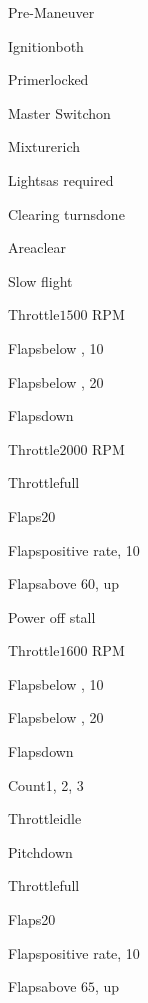 




\begin{multicols}{2}
  \begin{checklist}{Pre-Maneuver}
    \item{Ignition}{both}
    \item{Primer}{locked}
    \item{Master Switch}{on}
    \item{Mixture}{rich}
    \item{Lights}{as required}
    \item{Clearing turns}{done}
    \item{Area}{clear}
\end{checklist}

\begin{checklist}{Slow flight}
  \item{Throttle}{$1500$ RPM}
  \item{Flaps}{below \vfe, 10\degree}
  \item{Flaps}{below \vfe, 20\degree}
  \item{Flaps}{down}
  \item{Throttle}{$2000$ RPM}
  \item{Throttle}{full}
  \item{Flaps}{20\degree}
  \item{Flaps}{positive rate, 10\degree}
  \item{Flaps}{above 60, up}
\end{checklist}

\begin{checklist}{Power off stall}
  \item{Throttle}{$1600$ RPM}
  \item{Flaps}{below \vfe, 10\degree}
  \item{Flaps}{below \vfe, 20\degree}
  \item{Flaps}{down}
  \item{Count}{1, 2, 3}
  \item{Throttle}{idle}
  \item{Pitch}{down}
  \item{Throttle}{full}
  \item{Flaps}{20\degree}
  \item{Flaps}{positive rate, 10\degree}
  \item{Flaps}{above $65$, up}
\end{checklist}


\end{multicols}
